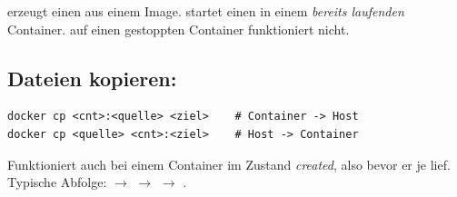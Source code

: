 \begin{formel}
 erzeugt einen  aus einem Image.
 startet einen  in einem \emph{bereits
laufenden} Container.  auf einen gestoppten Container
funktioniert nicht.
\end{formel}

\subsection{Dateien kopieren: }
\begin{lstlisting}
docker cp <cnt>:<quelle> <ziel>    # Container -> Host
docker cp <quelle> <cnt>:<ziel>    # Host -> Container
\end{lstlisting}
Funktioniert auch bei einem Container im Zustand \emph{created}, also
bevor er je lief. Typische Abfolge:  $\to$  $\to$
 $\to$ .
